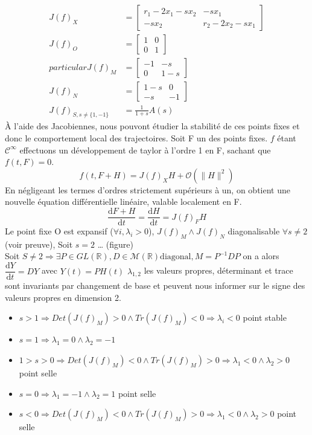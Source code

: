 \documentclass{wsdcr}
\begin{document}
\begin{equation}
\begin{aligned}
J(f)_X &= \begin{bmatrix}r_1-2x_1-sx_2&-sx_1\\-sx_2&r_2-2x_2-sx_1\end{bmatrix} \\
J(f)_{O} &= \begin{bmatrix}1&0\\0&1\end{bmatrix} \\particular
J(f)_{M} &= \begin{bmatrix}-1&-s\\0&1-s\end{bmatrix} \\
J(f)_{N} &= \begin{bmatrix}1-s&0\\-s&-1\end{bmatrix} \\
J(f)_{S,s\neq \{1,-1\}} &= \frac{1}{1+s}A(s)
\end{aligned}
\end{equation}
À l'aide des Jacobiennes, nous pouvont étudier la stabilité de ces points fixes et donc le comportement local des trajectoires. Soit F un des points fixes. $f$ étant $\mathcal{C}^\infty$ effectuons un développement de taylor à l'ordre 1 en F, sachant que $f(t,F)=0$.
\begin{equation}
f(t,F+H)=J(f)_XH + \mathcal{O}(\|H\|^2) 
\end{equation}
En négligeant les termes d'ordres strictement supérieurs à un, on obtient une nouvelle équation différentielle linéaire, valable localement en F.
\begin{equation}
{\dfrac {\mathrm {d} F+H}{\mathrm {d} t}}={\dfrac {\mathrm {d} H}{\mathrm {d} t}}=J(f)_FH
\end{equation}
Le point fixe O est expansif ($\forall i, \lambda_i > 0$), $J(f)_{M} \land J(f)_{N}$ diagonalisable $\forall s \neq 2$ (voir preuve), Soit $s=2$ … (figure) \\
Soit $S\neq2 \Rightarrow \exists P \in GL(\mathbb{R}),D \in \mathcal{M}(\mathbb{R}) \text{diagonal}, M = P^{-1}DP$ on a alors ${\dfrac {\mathrm {d} Y}{\mathrm {d} t}}=DY$ avec $Y(t)=PH(t)$ $\lambda_{1,2}$ les valeurs propres, déterminant et trace sont invariants par changement de base et peuvent nous informer sur le signe des valeurs propres en dimension 2.
\begin{itemize}
	\item $s>1 \Rightarrow Det(J(f)_{M})>0 \land Tr(J(f)_{M})<0 \Rightarrow \lambda_i<0$ {\color{red}point stable}
	\item $s=1 \Rightarrow \lambda_1=0 \land \lambda_2=-1$ 
	\item $1>s>0 \Rightarrow Det(J(f)_{M})<0 \land Tr(J(f)_{M})>0 \Rightarrow \lambda_1<0 \land \lambda_2>0$ {\color{red}point selle}
	\item $s=0 \Rightarrow \lambda_1=-1 \land \lambda_2=1$ {\color{red}point selle}
	\item $s<0 \Rightarrow Det(J(f)_{M})<0 \land Tr(J(f)_{M})>0 \Rightarrow \lambda_1<0 \land \lambda_2>0$ {\color{red}point selle}
\end{itemize}
\end{document}
